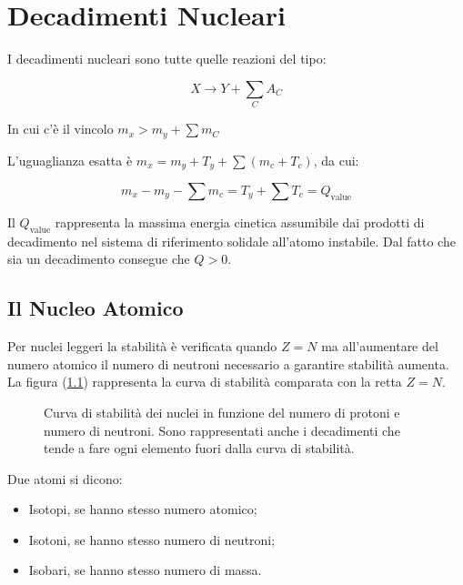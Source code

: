 
\chapter{Decadimenti Nucleari}

I decadimenti nucleari sono tutte quelle reazioni del tipo:

\begin{equation}
X \longrightarrow Y + \sum_C A_C
\end{equation}

In cui c'è il vincolo $m_x>m_y + \sum m_C$

L'uguaglianza esatta è $m_x=m_y+T_y+\sum (m_c+T_c)$, da cui:

\begin{equation}
m_x-m_y-\sum m_c = T_y + \sum T_c = Q_{\text{value}}
\end{equation}

Il $Q_{\text{value}}$ rappresenta la massima energia cinetica assumibile dai prodotti di decadimento nel sistema di riferimento solidale all'atomo instabile. Dal fatto che sia un decadimento consegue che $Q>0$. 


\section{Il Nucleo Atomico}

Per nuclei leggeri la stabilità è verificata quando $Z=N$ ma all'aumentare del numero atomico il numero di neutroni necessario a garantire stabilità aumenta. 
La figura (\ref{curvadistabilita}) rappresenta la curva di stabilità comparata con la retta $Z=N$.\\
\begin{figure}
\centering
		\caption{Curva di stabilità dei nuclei in funzione del numero di protoni e numero di neutroni. Sono rappresentati anche i decadimenti che tende a fare ogni elemento fuori dalla curva di stabilità.}
         \label{curvadistabilita}
\end{figure}

Due atomi si dicono:

\begin{itemize}
\item Isotopi, se hanno stesso numero atomico;
\item Isotoni, se hanno stesso numero di neutroni;
\item Isobari, se hanno stesso numero di massa.
\end{itemize}

